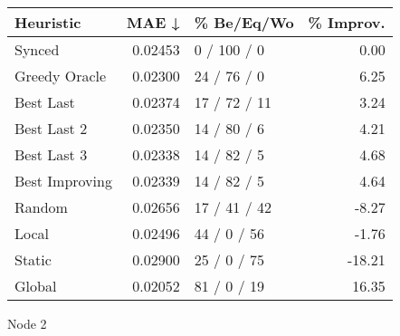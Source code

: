 \begin{tabular}{lrlr}
\toprule
\textbf{Heuristic} & \textbf{MAE ↓} & \textbf{\% Be/Eq/Wo} & \textbf{\% Improv.} \\
\midrule
            Synced &        0.02453 &          0 / 100 / 0 &                0.00 \\
     Greedy Oracle &        0.02300 &          24 / 76 / 0 &                6.25 \\
         Best Last &        0.02374 &         17 / 72 / 11 &                3.24 \\
       Best Last 2 &        0.02350 &          14 / 80 / 6 &                4.21 \\
       Best Last 3 &        0.02338 &          14 / 82 / 5 &                4.68 \\
    Best Improving &        0.02339 &          14 / 82 / 5 &                4.64 \\
            Random &        0.02656 &         17 / 41 / 42 &               -8.27 \\
             Local &        0.02496 &          44 / 0 / 56 &               -1.76 \\
            Static &        0.02900 &          25 / 0 / 75 &              -18.21 \\
            Global &        0.02052 &          81 / 0 / 19 &               16.35 \\
\bottomrule
\end{tabular}
\caption{Node 2}
\label{tab:non_lr05_le1_bs4_2}
